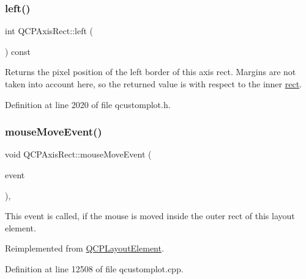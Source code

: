 \subsubsection{\texorpdfstring{left()}{left()}}
{\footnotesize\ttfamily int Q\+C\+P\+Axis\+Rect\+::left (\begin{DoxyParamCaption}{ }\end{DoxyParamCaption}) const\hspace{0.3cm}{\ttfamily [inline]}}

Returns the pixel position of the left border of this axis rect. Margins are not taken into account here, so the returned value is with respect to the inner \hyperlink{class_q_c_p_layout_element_a208effccfe2cca4a0eaf9393e60f2dd4}{rect}. 

Definition at line 2020 of file qcustomplot.\+h.

\mbox{\label{class_q_c_p_axis_rect_a4baf3d5dd69166788f6ceda0ea182c6e}} 
\subsubsection{\texorpdfstring{mouse\+Move\+Event()}{mouseMoveEvent()}}
{\footnotesize\ttfamily void Q\+C\+P\+Axis\+Rect\+::mouse\+Move\+Event (\begin{DoxyParamCaption}\item[{Q\+Mouse\+Event $\ast$}]{event }\end{DoxyParamCaption})\hspace{0.3cm}{\ttfamily [protected]}, {\ttfamily [virtual]}}

This event is called, if the mouse is moved inside the outer rect of this layout element. 

Reimplemented from \hyperlink{class_q_c_p_layout_element_a14f4acf58cdb8dd2c6c571479c4c4a40}{Q\+C\+P\+Layout\+Element}.



Definition at line 12508 of file qcustomplot.\+cpp.

\mbox{\label{class_q_c_p_axis_rect_a77501dbeccdac7256f7979b05077c04e}} 
